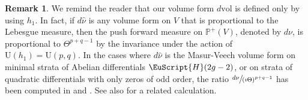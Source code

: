 \documentclass[10pt]{amsart}
\let\mathcal\EuScript
\theoremstyle{plain}
\theoremstyle{definition}
\newtheorem{Remark}[Theorem]{Remark}
\newcommand{\Pb}{\mathbb{P}}
\newcommand{\cH}{\mathcal{H}}
\newcommand{\vol}{\mathrm{vol}}
\newcommand{\Ur}{\mathrm{U}}
\begin{document}
\begin{Remark}\label{rk:push:meas:n:curvature}
We remind the reader that our volume form $d\vol$ is defined only by using $h_1$.
In fact, if $d\hat{\nu}$ is any volume form on $V$ that is proportional to the Lebesgue measure, then the push forward measure on $\Pb^+(V)$, denoted by $d\nu$, is proportional to $\Theta^{p+q-1}$ by the invariance under the action of $\Ur(h_1)=\Ur(p,q)$.
In the cases where $d\hat{\nu}$ is the Masur-Veech volume form on minimal strata of Abelian differentials $\cH(2g-2)$, or on strata of quadratic differentials with only zeros of odd order, the ratio $\sfrac{d\nu}{(\imath\Theta)^{p+q-1}}$ has been computed in \cite{Sau18} and \cite{CMS19}.
See also \cite[Lem.\,5.1]{Sau20} for a related calculation.
\end{Remark}
\end{document}
